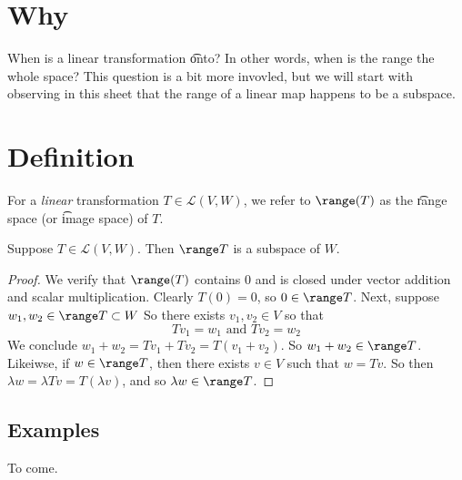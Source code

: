 
\section*{Why}

When is a linear transformation \t{onto}?
In other words, when is the range the whole space?
This question is a bit more invovled, but we will start with observing in this sheet that the range of a linear map happens to be a subspace.

\section*{Definition}

For a \textit{linear} transformation $T \in \mathcal{L} (V, W)$, we refer to $\range(T)$ as the \t{range space} (or \t{image space}) of $T$.


\begin{proposition}
Suppose $T \in \mathcal{L} (V, W)$.
Then $\range T$ is a subspace of $W$.
\end{proposition}

\begin{proof}We verify that $\range(T)$ contains $0$ and is closed under vector addition and scalar multiplication.
Clearly $T(0) = 0$, so $0 \in \range T$.
Next, suppose $w_1, w_2 \in \range T \subset W$
So there exists $v_1, v_2 \in V$ so that
\[
Tv_1 = w_1 \text{ and } Tv_2 = w_2
\]
We conclude $w_1 + w_2 = Tv_1 + Tv_2 = T(v_1 + v_2)$.
So $w_1 + w_2 \in \range T$.
Likeiwse, if $w \in \range T$, then there exists $v \in V$ such that $w = Tv$.
So then $\lambda  w = \lambda  Tv = T(\lambda v)$, and so $\lambda w \in \range T$.\end{proof}
\subsection*{Examples}

To come.
\blankpage